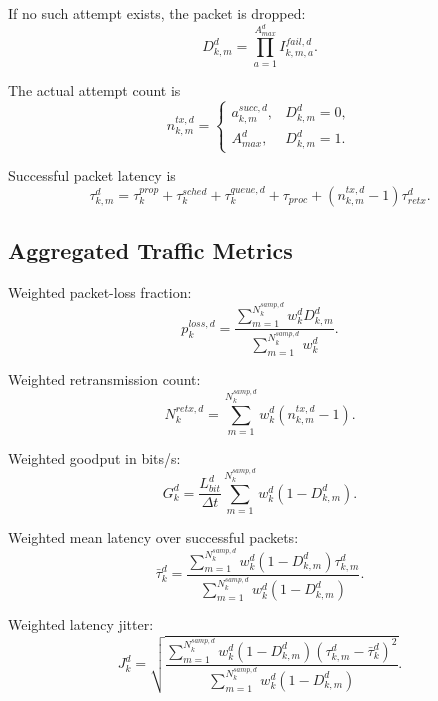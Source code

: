 \documentclass[11pt]{article}
\begin{document}
If no such attempt exists, the packet is dropped:
\begin{equation}
  D^{d}_{k,m} = \prod_{a=1}^{A^{d}_{max}} I^{fail,d}_{k,m,a}.
\end{equation}

The actual attempt count is
\begin{equation}
  n^{tx,d}_{k,m}
  =
  \begin{cases}
    a^{succ,d}_{k,m}, & D^{d}_{k,m}=0, \\
    A^{d}_{max}, & D^{d}_{k,m}=1.
  \end{cases}
\end{equation}

Successful packet latency is
\begin{equation}
  \tau^{d}_{k,m}
  =
  \tau^{prop}_k
  + \tau^{sched}_k
  + \tau^{queue,d}_k
  + \tau_{proc}
  + (n^{tx,d}_{k,m}-1)\tau^{d}_{retx}.
\end{equation}

\subsection{Aggregated Traffic Metrics}

Weighted packet-loss fraction:
\begin{equation}
  p^{loss,d}_k
  =
  \frac{\sum_{m=1}^{N^{samp,d}_k} w^{d}_k D^{d}_{k,m}}
       {\sum_{m=1}^{N^{samp,d}_k} w^{d}_k}.
\end{equation}

Weighted retransmission count:
\begin{equation}
  N^{retx,d}_k
  =
  \sum_{m=1}^{N^{samp,d}_k} w^{d}_k (n^{tx,d}_{k,m} - 1).
\end{equation}

Weighted goodput in bits/s:
\begin{equation}
  G^{d}_k
  =
  \frac{L^{d}_{bit}}{\Delta t}
  \sum_{m=1}^{N^{samp,d}_k} w^{d}_k (1-D^{d}_{k,m}).
\end{equation}

Weighted mean latency over successful packets:
\begin{equation}
  \bar{\tau}^{d}_k
  =
  \frac{
    \sum_{m=1}^{N^{samp,d}_k} w^{d}_k (1-D^{d}_{k,m})\tau^{d}_{k,m}
  }{
    \sum_{m=1}^{N^{samp,d}_k} w^{d}_k (1-D^{d}_{k,m})
  }.
\end{equation}

Weighted latency jitter:
\begin{equation}
  J^{d}_k
  =
  \sqrt{
    \frac{
      \sum_{m=1}^{N^{samp,d}_k} w^{d}_k (1-D^{d}_{k,m})(\tau^{d}_{k,m} - \bar{\tau}^{d}_k)^2
    }{
      \sum_{m=1}^{N^{samp,d}_k} w^{d}_k (1-D^{d}_{k,m})
    }
  }.
\end{equation}
\end{document}
